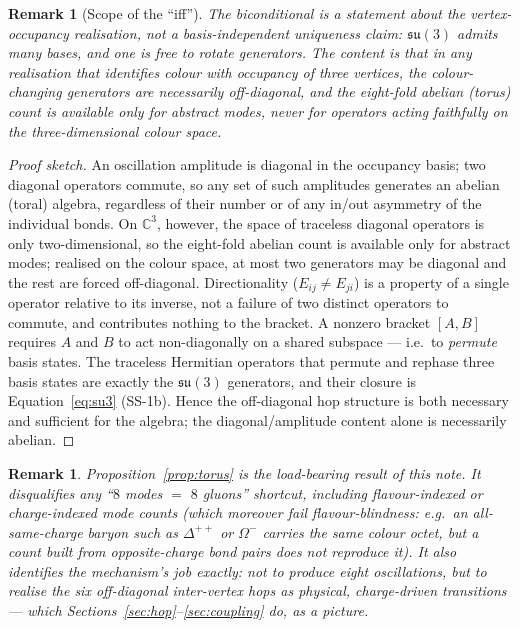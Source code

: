 \documentclass[11pt,a4paper]{article}
\newtheorem{remark}[theorem]{Remark}
\begin{document}
\begin{remark}[Scope of the ``iff'']
\label{rem:iff}
The biconditional is a statement \emph{about the vertex-occupancy realisation},
not a basis-independent uniqueness claim: $\mathfrak{su}(3)$ admits many bases,
and one is free to rotate generators. The content is that in \emph{any}
realisation that identifies colour with occupancy of three vertices, the
colour-changing generators are necessarily off-diagonal, and the eight-fold
abelian (torus) count is available only for abstract modes, never for
operators acting faithfully on the three-dimensional colour space.
\end{remark}

\begin{proof}[Proof sketch]
An oscillation amplitude is diagonal in the occupancy basis; two diagonal
operators commute, so any set of such amplitudes generates an abelian (toral)
algebra, regardless of their number or of any in/out asymmetry of the individual
bonds. On $\mathbb{C}^3$, however, the space of traceless diagonal operators is
only two-dimensional, so the eight-fold abelian count is available only for
abstract modes; realised on the colour space, at most two generators may be
diagonal and the rest are forced off-diagonal. Directionality ($E_{ij}\neq E_{ji}$) is a property of a single operator
relative to its inverse, not a failure of two distinct operators to commute, and
contributes nothing to the bracket. A nonzero bracket $[A,B]$ requires $A$ and
$B$ to act non-diagonally on a shared subspace --- i.e.\ to \emph{permute} basis
states. The traceless Hermitian operators that permute and rephase three basis
states are exactly the $\mathfrak{su}(3)$ generators, and their closure is
Equation~\eqref{eq:su3} (SS-1b). Hence the off-diagonal hop structure is both
necessary and sufficient for the algebra; the diagonal/amplitude content alone
is necessarily abelian.
\end{proof}

\begin{remark}
Proposition~\ref{prop:torus} is the load-bearing result of this note. It
disqualifies any ``$8$ modes $=$ $8$ gluons'' shortcut, including
flavour-indexed or charge-indexed mode counts (which moreover fail
flavour-blindness: e.g.\ an all-same-charge baryon such as $\Delta^{++}$ or
$\Omega^-$ carries the same colour octet, but a count built from
opposite-charge bond pairs does not reproduce it). It also identifies the
mechanism's job exactly: not to produce eight oscillations, but to realise the
six \emph{off-diagonal} inter-vertex hops as physical, charge-driven
transitions --- which Sections~\ref{sec:hop}--\ref{sec:coupling} do, as a
picture.
\end{remark}
\end{document}
